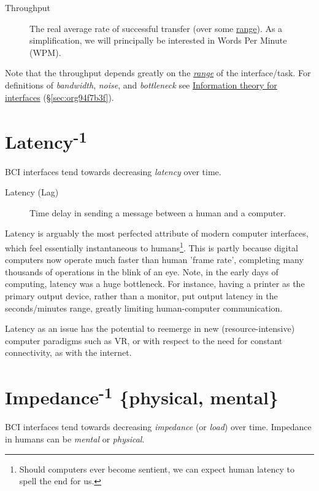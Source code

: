 \documentclass[logo,bsc,singlespacing,parskip]{infthesis}
\begin{document}
\begin{mdframed}
\begin{description}
\item[{Throughput\label{throughput}}] The real average rate of successful transfer (over some  \hyperref[range]{range}). As a simplification, we will principally be interested in Words Per Minute (WPM).
\end{description}
\end{mdframed}

Note that the throughput depends greatly on the \emph{\hyperref[range]{range}} of the interface/task.
For definitions of \emph{bandwidth}, \emph{noise}, and \emph{bottleneck} see \hyperref[sec:org94f7b3f]{Information theory for interfaces} (\S \ref{sec:org94f7b3f}).

\section{Latency\textsuperscript{-1}}
\label{sec:org242fc1a}
BCI interfaces tend towards decreasing \emph{latency} over time.

\begin{mdframed}
\begin{description}
\item[{Latency\label{latency} (Lag)}] Time delay in sending a message between a human and a computer.
\end{description}
\end{mdframed}

Latency is arguably the most perfected attribute of modern computer interfaces, which feel essentially instantaneous to humans\footnote{Should computers ever become sentient, we can expect human latency to spell the end for us.}.
This is partly because digital computers now operate much faster than human 'frame rate', completing many thousands of operations in the blink of an eye.
Note, in the early days of computing, latency was a huge bottleneck.
For instance, having a printer as the primary output device, rather than a monitor, put output latency in the seconds/minutes range, greatly limiting human-computer communication.

Latency as an issue has the potential to reemerge in new (resource-intensive) computer paradigms such as VR, or with respect to the need for constant connectivity, as with the internet.

\section{Impedance\textsuperscript{-1} \{physical, mental\}}
\label{sec:org326f2a8}
BCI interfaces tend towards decreasing \emph{impedance} (or \emph{load}) over time.
Impedance in humans can be \emph{mental} or \emph{physical}.
\end{document}
